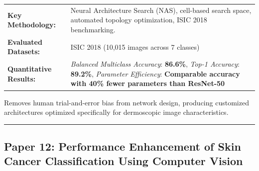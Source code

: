 \documentclass[10pt,a4paper]{article}
\begin{document}
\vspace{4pt}
\begin{tabularx}{\linewidth}{p{3.2cm}X}
\toprule
\textbf{Key Methodology:} & Neural Architecture Search (NAS), cell-based search space, automated topology optimization, ISIC 2018 benchmarking. \\
\textbf{Evaluated Datasets:} & ISIC 2018 (10,015 images across 7 classes) \\
\textbf{Quantitative Results:} & \textit{Balanced Multiclass Accuracy}: \textbf{86.6\%}, \textit{Top-1 Accuracy}: \textbf{89.2\%}, \textit{Parameter Efficiency}: \textbf{Comparable accuracy with 40\% fewer parameters than ResNet-50} \\
\bottomrule
\end{tabularx}
\vspace{4pt}
\begin{tcolorbox}[utilitybox,title=Clinical Utility and Real-World Impact]
Removes human trial-and-error bias from network design, producing customized architectures optimized specifically for dermoscopic image characteristics.
\end{tcolorbox}
\vspace{12pt}
\hrule
\vspace{12pt}
\subsection*{Paper 12: Performance Enhancement of Skin Cancer Classification Using Computer Vision}
\end{document}

